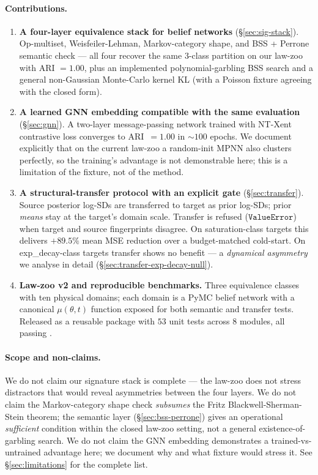 \documentclass{article}
\begin{document}
\paragraph{Contributions.}
\begin{enumerate}[leftmargin=*, itemsep=2pt]
\item \textbf{A four-layer equivalence stack for belief networks}
(\S\ref{sec:sig-stack}). Op-multiset, Weisfeiler-Lehman, Markov-category
shape, and BSS + Perrone semantic check --- all four recover the same
$3$-class partition on our law-zoo with ARI $= 1.00$, plus an
implemented polynomial-garbling BSS search and a general
non-Gaussian Monte-Carlo kernel KL (with a Poisson fixture agreeing
with the closed form).

\item \textbf{A learned GNN embedding compatible with the same
evaluation} (\S\ref{sec:gnn}). A two-layer message-passing network
trained with NT-Xent contrastive loss converges to ARI~$= 1.00$ in
$\sim 100$ epochs. We document explicitly that on the current law-zoo
a random-init MPNN also clusters perfectly, so the training's
advantage is not demonstrable here; this is a limitation of the
fixture, not of the method.

\item \textbf{A structural-transfer protocol with an explicit gate}
(\S\ref{sec:transfer}). Source posterior log-SDs are transferred to
target as prior log-SDs; prior \emph{means} stay at the target's
domain scale. Transfer is refused ($\texttt{ValueError}$) when target
and source fingerprints disagree. On saturation-class targets this
delivers $+89.5\%$ mean MSE reduction over a budget-matched
cold-start. On exp\_decay-class targets transfer shows no benefit ---
a \emph{dynamical asymmetry} we analyse in detail
(\S\ref{sec:transfer-exp-decay-null}).

\item \textbf{Law-zoo v2 and reproducible benchmarks.} Three
equivalence classes with ten physical domains; each domain is a PyMC
belief network with a canonical $\mu(\theta, t)$ function exposed for
both semantic and transfer tests. Released as a reusable package with
$53$ unit tests across $8$ modules, all passing
\citep{Anonymous2026MEIS}.
\end{enumerate}

\paragraph{Scope and non-claims.}
We do not claim our signature stack is complete --- the law-zoo does
not stress distractors that would reveal asymmetries between the
four layers. We do not claim the Markov-category shape check
\emph{subsumes} the Fritz Blackwell-Sherman-Stein theorem; the
semantic layer (\S\ref{sec:bss-perrone}) gives an operational
\emph{sufficient} condition within the closed law-zoo setting, not a
general existence-of-garbling search. We do not claim the GNN
embedding demonstrates a trained-vs-untrained advantage here; we
document why and what fixture would stress it. See
\S\ref{sec:limitations} for the complete list.
\end{document}
